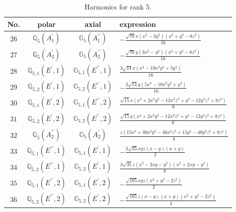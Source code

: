 \documentclass[fleqn,8pt,landscape]{jsarticle}
\begin{document}
\begin{table}[ht!]
\begin{center}
\caption{Harmonics for rank 5.}
\renewcommand{\arraystretch}{1.3}
\begin{tabular}{cccl} \hline \hline
No. & polar & axial & expression \\ \hline
$ 26 $ & $ \mathbb{Q}_{5}(A_{1}^{\prime}) $ & $ \mathbb{G}_{5}(A_{1}^{\prime\prime}) $ & $ - \frac{\sqrt{70} x \left(x^{2} - 3 y^{2}\right) \left(x^{2} + y^{2} - 8 z^{2}\right)}{16} $ \\
$ 27 $ & $ \mathbb{Q}_{5}(A_{2}^{\prime}) $ & $ \mathbb{G}_{5}(A_{2}^{\prime\prime}) $ & $ - \frac{\sqrt{70} y \left(3 x^{2} - y^{2}\right) \left(x^{2} + y^{2} - 8 z^{2}\right)}{16} $ \\
$ 28 $ & $ \mathbb{Q}_{5,1}(E^{\prime},1) $ & $ \mathbb{G}_{5,1}(E^{\prime\prime},1) $ & $ \frac{3 \sqrt{14} x \left(x^{4} - 10 x^{2} y^{2} + 5 y^{4}\right)}{16} $ \\
$ 29 $ & $ \mathbb{Q}_{5,2}(E^{\prime},1) $ & $ \mathbb{G}_{5,2}(E^{\prime\prime},1) $ & $ - \frac{3 \sqrt{14} y \left(5 x^{4} - 10 x^{2} y^{2} + y^{4}\right)}{16} $ \\
$ 30 $ & $ \mathbb{Q}_{5,1}(E^{\prime},2) $ & $ \mathbb{G}_{5,1}(E^{\prime\prime},2) $ & $ \frac{\sqrt{15} x \left(x^{4} + 2 x^{2} y^{2} - 12 x^{2} z^{2} + y^{4} - 12 y^{2} z^{2} + 8 z^{4}\right)}{8} $ \\
$ 31 $ & $ \mathbb{Q}_{5,2}(E^{\prime},2) $ & $ \mathbb{G}_{5,2}(E^{\prime\prime},2) $ & $ \frac{\sqrt{15} y \left(x^{4} + 2 x^{2} y^{2} - 12 x^{2} z^{2} + y^{4} - 12 y^{2} z^{2} + 8 z^{4}\right)}{8} $ \\
$ 32 $ & $ \mathbb{Q}_{5}(A_{2}^{\prime\prime}) $ & $ \mathbb{G}_{5}(A_{2}^{\prime}) $ & $ \frac{z \left(15 x^{4} + 30 x^{2} y^{2} - 40 x^{2} z^{2} + 15 y^{4} - 40 y^{2} z^{2} + 8 z^{4}\right)}{8} $ \\
$ 33 $ & $ \mathbb{Q}_{5,1}(E^{\prime\prime},1) $ & $ \mathbb{G}_{5,1}(E^{\prime},1) $ & $ - \frac{3 \sqrt{35} x y z \left(x - y\right) \left(x + y\right)}{2} $ \\
$ 34 $ & $ \mathbb{Q}_{5,2}(E^{\prime\prime},1) $ & $ \mathbb{G}_{5,2}(E^{\prime},1) $ & $ \frac{3 \sqrt{35} z \left(x^{2} - 2 x y - y^{2}\right) \left(x^{2} + 2 x y - y^{2}\right)}{8} $ \\
$ 35 $ & $ \mathbb{Q}_{5,1}(E^{\prime\prime},2) $ & $ \mathbb{G}_{5,1}(E^{\prime},2) $ & $ - \frac{\sqrt{105} x y z \left(x^{2} + y^{2} - 2 z^{2}\right)}{2} $ \\
$ 36 $ & $ \mathbb{Q}_{5,2}(E^{\prime\prime},2) $ & $ \mathbb{G}_{5,2}(E^{\prime},2) $ & $ - \frac{\sqrt{105} z \left(x - y\right) \left(x + y\right) \left(x^{2} + y^{2} - 2 z^{2}\right)}{4} $ \\
 \hline \hline
\end{tabular}
\end{center}
\end{table}
\end{document}
